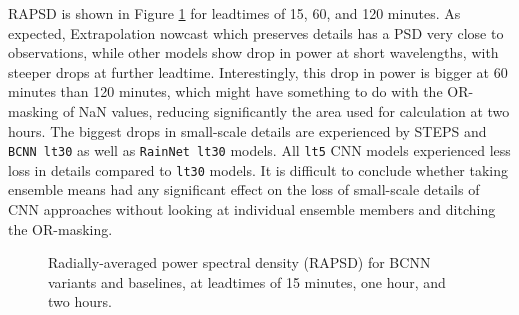 RAPSD is shown in Figure \ref{fig:rapsd} for leadtimes of 15, 60, and 120 minutes. As expected, Extrapolation nowcast which preserves details has a PSD very close to observations, while other models show drop in power at short wavelengths, with steeper drops at further leadtime. Interestingly, this drop in power is bigger at 60 minutes than 120 minutes, which might have something to do with the OR-masking of NaN values, reducing significantly the area used for calculation at two hours. The biggest drops in small-scale details are experienced by STEPS and \texttt{BCNN lt30} as well as \texttt{RainNet lt30} models. All \texttt{lt5} CNN models experienced less loss in details compared to \texttt{lt30} models. It is difficult to conclude whether taking ensemble means had any significant effect on the loss of small-scale details of CNN approaches without looking at individual ensemble members and ditching the OR-masking.

\begin{figure}[H]
	\centering
	\caption{Radially-averaged power spectral density (RAPSD) for BCNN variants and baselines, at leadtimes of 15 minutes, one hour, and two hours.}
	\label{fig:rapsd}
\end{figure}

